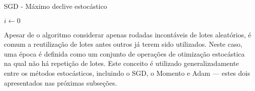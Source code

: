       \begin{algorithm}
        \caption{SGD - Máximo declive estocástico}\label{alg:sgd}
        \DIFdelbegin %
\DIFdelend \DIFaddbegin {}
        \BlankLine
        \DIFaddend $i \gets 0$
        \DIFdelbegin %
\DIFdelend \DIFaddbegin {}
        \DIFaddend \end{algorithm}


      Apesar de o algoritmo considerar apenas rodadas incontáveis de lotes aleatórios, é comum \DIFdelbegin {}\DIFdelend \DIFaddbegin {}\DIFaddend a reutilização de lotes antes \DIFdelbegin {}\DIFdelend \DIFaddbegin {}\DIFaddend outros já terem sido utilizados. Neste caso, uma época é definida como um conjunto de operações de otimização estocástica na qual não há repetição de lotes. Este conceito é utilizado generalizadamente entre os métodos estocásticos, incluindo o SGD, o Momento e Adam --- estes dois apresentados nas próximas subseções.

